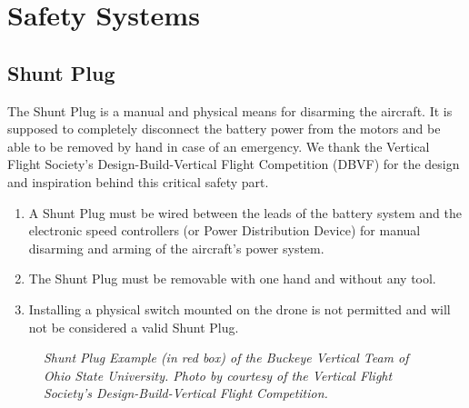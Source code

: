 \documentclass{article}
\begin{document}
\section{Safety Systems}

\subsection{Shunt Plug}
The Shunt Plug is a manual and physical means for disarming the aircraft. It is supposed to completely disconnect the battery power from the motors and be able to be removed by hand in case of an emergency. We thank the Vertical Flight Society's Design-Build-Vertical Flight Competition (DBVF) for the design and inspiration behind this critical safety part. 
\begin{enumerate}
  \item A Shunt Plug must be wired between the leads of the battery system and the electronic speed controllers (or Power Distribution Device) for manual disarming and arming of the aircraft's power system.
  \item The Shunt Plug must be removable with one hand and without any tool.
  \item Installing a physical switch mounted on the drone is not permitted and will not be considered a valid Shunt Plug.
  \end{enumerate}

  \begin{figure}[h!]
    \centering
   \caption{\textit{Shunt Plug Example (in red box) of the Buckeye Vertical Team of Ohio State University. Photo by courtesy of the Vertical Flight Society's Design-Build-Vertical Flight Competition.}}
   \end{figure}
\end{document}
